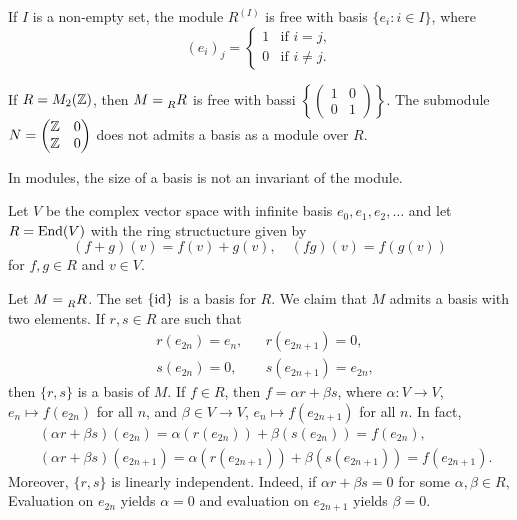 \begin{example}
If $I$ is a non-empty set, the module $R^{(I)}$ is free with basis 
$\{e_i:i\in I\}$, where 
\[
(e_i)_j=\begin{cases}
	1 & \text{if $i=j$},\\
	0 & \text{if $i\ne j$.}
	\end{cases}	
\]
\end{example}

\begin{example}
If $R=M_2(\mathbb{Z})$, then $M=\prescript{}{R}R$ is free with bassi $\left\{\begin{pmatrix}
    1&0\\0&1\end{pmatrix}\right\}$. The submodule 
$N=\begin{pmatrix}\mathbb{Z}&0\\\mathbb{Z}&0\end{pmatrix}$ does not admits a basis as a module over $R$.
\end{example}

In modules, the size of a basis is not an invariant of the module.  

\begin{example}
Let $V$ be the complex vector space with infinite basis $e_0,e_1,e_2,\dots$ and let 
$R=\operatorname{End}(V)$ with the ring structucture given by 
\[
(f+g)(v)=f(v)+g(v),\quad
(fg)(v)=f(g(v))
\]
for $f,g\in R$ and $v\in V$. 

Let $M=\prescript{}{R}R$. 
The set $\{\operatorname{id}\}$ is a basis for $R$.  
We claim that $M$ admits a basis with two elements. If
$r,s\in R$ are such that 
\begin{align*}
&r(e_{2n})=e_n, && r(e_{2n+1})=0,\\
&s(e_{2n})=0,&& s(e_{2n+1})=e_{2n},
\end{align*}
then $\{r,s\}$ is a basis of $M$. 
If $f\in R$, then
$f=\alpha r+\beta s$, where $\alpha\colon V\to V$, $e_n\mapsto f(e_{2n})$ for all $n$, and
$\beta\in V\to V$, $e_n\mapsto f(e_{2n+1})$ for all $n$. In fact,
\begin{align*}
&(\alpha r+\beta s)(e_{2n})=\alpha(r(e_{2n}))+\beta(s(e_{2n}))=f(e_{2n}),\\
&(\alpha r+\beta s)(e_{2n+1})=\alpha(r(e_{2n+1}))+\beta(s(e_{2n+1}))=f(e_{2n+1}).
\end{align*}
Moreover, $\{r,s\}$ is linearly independent. Indeed, if $\alpha r+\beta s=0$ for some $\alpha,\beta\in R$,  
Evaluation on $e_{2n}$ yields $\alpha=0$ and evaluation on $e_{2n+1}$ yields $\beta=0$.   
\end{example} 


